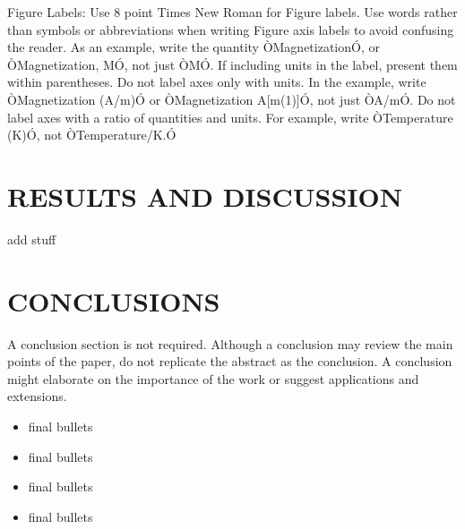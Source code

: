 \documentclass[letterpaper, 10 pt, conference]{ieeeconf}  %
\begin{document}
Figure Labels: Use 8 point Times New Roman for Figure labels. Use words rather than symbols or abbreviations when writing Figure axis labels to avoid confusing the reader. As an example, write the quantity ÒMagnetizationÓ, or ÒMagnetization, MÓ, not just ÒMÓ. If including units in the label, present them within parentheses. Do not label axes only with units. In the example, write ÒMagnetization (A/m)Ó or ÒMagnetization {A[m(1)]}Ó, not just ÒA/mÓ. Do not label axes with a ratio of quantities and units. For example, write ÒTemperature (K)Ó, not ÒTemperature/K.Ó


\section{RESULTS AND DISCUSSION}
add stuff

\section{CONCLUSIONS}

A conclusion section is not required. Although a conclusion may review the main points of the paper, do not replicate the abstract as the conclusion. A conclusion might elaborate on the importance of the work or suggest 
applications and extensions. 

\begin{itemize}

\item final bullets 
\item final bullets 
\item final bullets 
\item final bullets 
\end{itemize}

\addtolength{\textheight}{-12cm}   %




\end{document}
